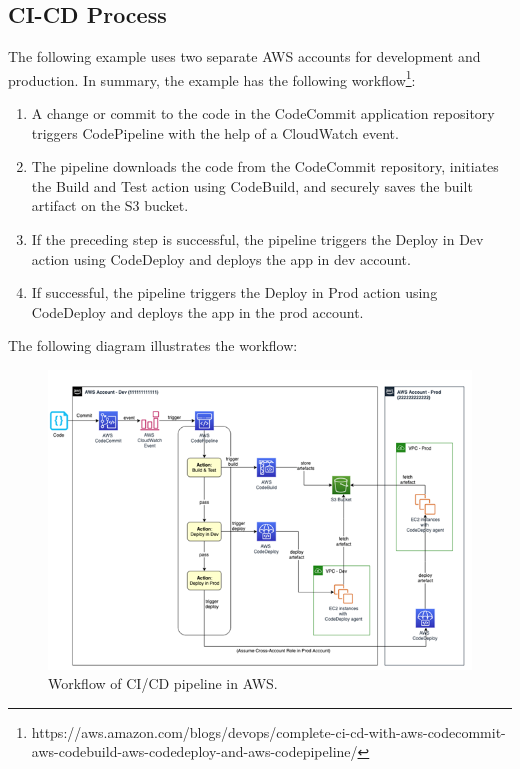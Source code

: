 %
\subsection{CI-CD Process}
%
The following example uses two separate AWS accounts for development and production.
In summary, the example has the following workflow\footnote{https://aws.amazon.com/blogs/devops/complete-ci-cd-with-aws-codecommit-aws-codebuild-aws-codedeploy-and-aws-codepipeline/}:

\begin{enumerate}
    \item A change or commit to the code in the CodeCommit application repository triggers CodePipeline with the help of a CloudWatch event.
    
    \item The pipeline downloads the code from the CodeCommit repository, initiates the Build and Test action using CodeBuild, and securely saves the built artifact on the S3 bucket.
    
    \item If the preceding step is successful, the pipeline triggers the Deploy in Dev action using CodeDeploy and deploys the app in dev account.
    
    \item If successful, the pipeline triggers the Deploy in Prod action using CodeDeploy and deploys the app in the prod account.
\end{enumerate}

The following diagram illustrates the workflow:

\begin{figure}[h]
    \centering
    \includegraphics[width=\textwidth]{images/aws_cicd.png}
    \caption{Workflow of CI/CD pipeline in AWS.}
    \label{fig:aws_cicd}
\end{figure}


